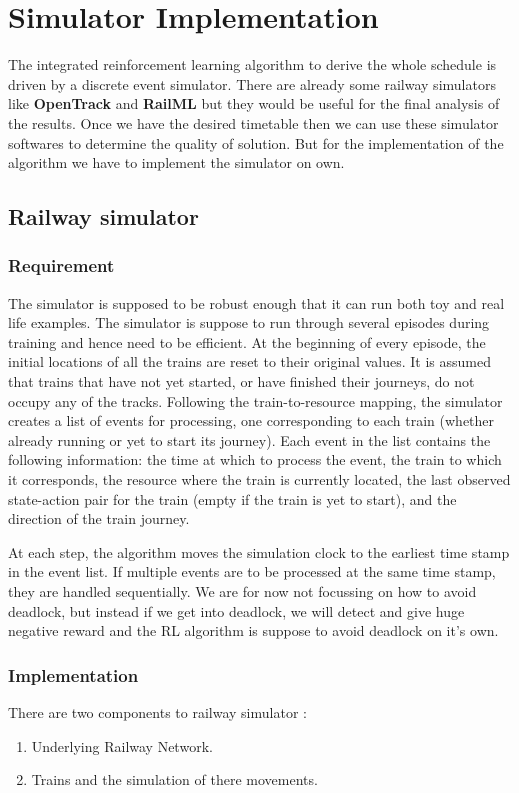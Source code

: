 \chapter{Simulator Implementation}
The integrated reinforcement learning algorithm to derive the whole schedule is driven
by a discrete event simulator. There are already some railway simulators like \textbf{OpenTrack} \cite{WEBSITE:2} and \textbf{RailML}\cite{WEBSITE:3} but they
would be useful for the final analysis of the results. Once we have the desired timetable then we can use these 
simulator softwares to determine the quality of solution. But for the implementation of the 
algorithm we have to implement the simulator on own.

\section {Railway simulator}
\subsection{Requirement}
The simulator is supposed to be robust enough that it can run both toy and real life 
examples. 
The simulator is suppose to run through several episodes during training and hence need 
to be efficient. At the
beginning of every episode, the initial locations of all the trains
are reset to their original values. It is assumed that trains that have not yet started, 
or have finished their journeys, do not
occupy any of the tracks. Following the train-to-resource mapping, 
the simulator creates a list of events for processing, one
corresponding to each train (whether already running or yet to
start its journey). Each event in the list contains the following
information: the time at which to process the event, the train to
which it corresponds, the resource where the train is currently
located, the last observed state-action pair for the train (empty
if the train is yet to start), and the direction of the train journey. 

\vspace{\baselineskip}
At each step, the algorithm moves the simulation clock to
the earliest time stamp in the event list. If multiple events are to
be processed at the same time stamp, they are handled sequentially. We are for now 
not focussing on how to avoid deadlock, but instead if we get into deadlock, we will detect and give huge
negative reward and the RL algorithm is suppose to avoid deadlock on it's own.


\subsection{Implementation}
There are two components to railway simulator :
\begin{enumerate}
    \item Underlying Railway Network. 
    \item Trains and the simulation of there movements.
\end{enumerate}


